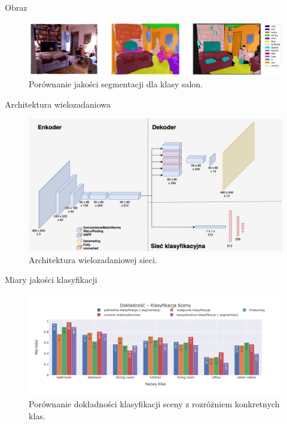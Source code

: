 \documentclass[10pt]{beamer}
\begin{document}
\begin{frame}{Obraz}
    \begin{figure}[ht!]
        \centering
        \includegraphics[width=\textwidth]{images/living_room-1.png}
        \caption{Porównanie jakości segmentacji dla klasy salon.}
        \label{fig:living_room-pred-1}
    \end{figure}
\end{frame}
\begin{frame}{Architektura wielozadaniowa}
    \begin{figure}[ht!]
    \centering
    \includegraphics[width=\textwidth]{images/multitask-arch-new.png}
    \caption{Architektura wielozadaniowej sieci.}
    \label{fig:multitask}
    \end{figure}
    
\end{frame}
\begin{frame}{Miary jakości klasyfikacji}
    
    \begin{figure}[ht!]
        \centering
        \includegraphics[width=\textwidth]{images/pl-res/Dokladnosc-Klasyfikacja-Sceny.jpeg}
        \caption{Porównanie dokładności klasyfikacji sceny z rozróżniem konkretnych klas.}
        \label{fig:classification-accuracy}
    \end{figure}
\end{frame}
\end{document}
